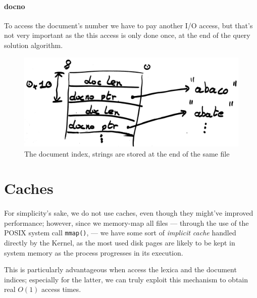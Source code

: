 \paragraph{docno}
To access the document's number we have to pay another I/O access, but that's not very important as the this access is only done once, at the end of the query solution algorithm.

\begin{figure}[h]
	\centering
	\includegraphics[width=0.7\linewidth]{assets/document_index}
	\caption{The document index, strings are stored at the end of the same file}
	\label{fig:documentindex}
\end{figure}

\section{Caches}

\paragraph{}
For simplicity's sake, we do not use caches, even though they might've improved performance; however, since we memory-map all files --- through the use of the POSIX system call \texttt{mmap()}, --- we have some sort of \textit{implicit cache} handled directly by the Kernel, as the most used disk pages are likely to be kept in system memory as the process progresses in its execution.

This is particularly advantageous when access the lexica and the document indices; especially for the latter, we can truly exploit this mechanism to obtain real $O(1)$ access times.


